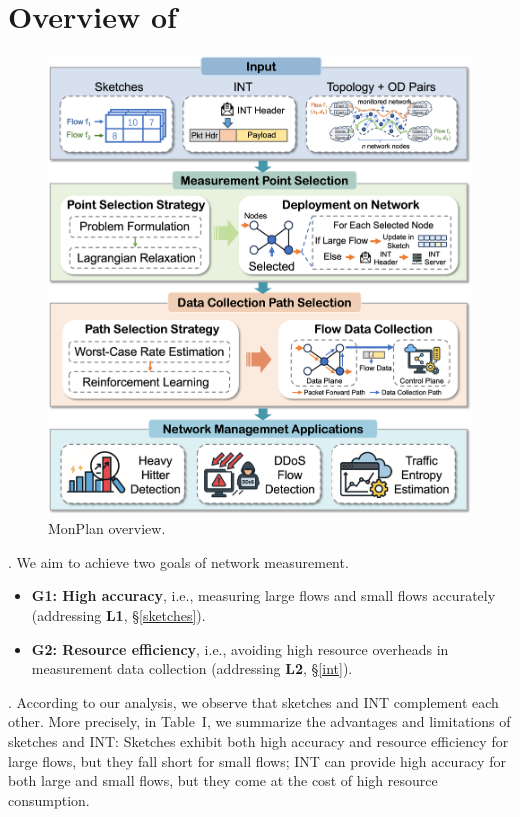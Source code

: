\section{Overview of \sysname}\label{sec:overview}

\begin{figure}
    \centering
    \includegraphics[width=\linewidth]{pics/overview.png}
    \caption{MonPlan overview.}
    \label{overview}
\end{figure}

. We aim to achieve two goals of network measurement.

\begin{itemize}[leftmargin=*]
%
    \item \textbf{G1: High accuracy}, i.e., measuring large flows and small flows accurately (addressing \textbf{L1}, \S\ref{sketches}). 
%
    \item \textbf{G2: Resource efficiency}, i.e., avoiding high resource overheads in measurement data collection (addressing \textbf{L2}, \S\ref{int}). 
%
\end{itemize}

. According to our analysis, we observe that sketches and INT complement each other. More precisely, in Table~I, we summarize the advantages and limitations of sketches and INT: Sketches exhibit both high accuracy and resource efficiency for large flows, but they fall short for small flows; INT can provide high accuracy for both large and small flows, but they come at the cost of high resource consumption. 

